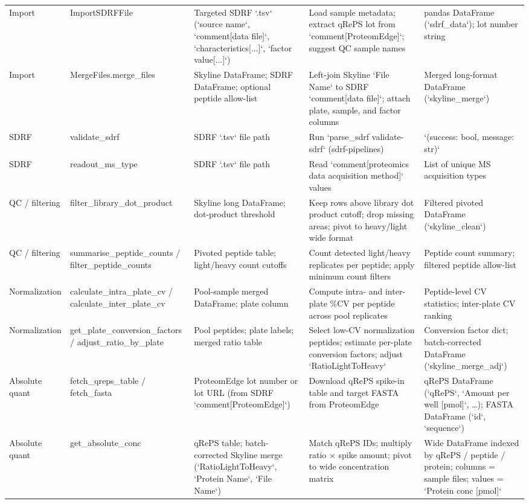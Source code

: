 \begin{table}
\begin{tabular}{llp{3.5cm}p{4.5cm}p{3.5cm}}
Import & ImportSDRFFile & Targeted SDRF `.tsv` (`source name`, `comment[data file]`, `characteristics[...]`, `factor value[...]`) & Load sample metadata; extract qRePS lot from `comment[ProteomEdge]`; suggest QC sample names & pandas DataFrame (`sdrf\_data`); lot number string \\
Import & MergeFiles.merge\_files & Skyline DataFrame; SDRF DataFrame; optional peptide allow-list & Left-join Skyline `File Name` to SDRF `comment[data file]`; attach plate, sample, and factor columns & Merged long-format DataFrame (`skyline\_merge`) \\
SDRF & validate\_sdrf & SDRF `.tsv` file path & Run `parse\_sdrf validate-sdrf` (sdrf-pipelines) & `(success: bool, message: str)` \\
SDRF & readout\_ms\_type & SDRF `.tsv` file path & Read `comment[proteomics data acquisition method]` values & List of unique MS acquisition types \\
QC / filtering & filter\_library\_dot\_product & Skyline long DataFrame; dot-product threshold & Keep rows above library dot product cutoff; drop missing areas; pivot to heavy/light wide format & Filtered pivoted DataFrame (`skyline\_clean`) \\
QC / filtering & summarise\_peptide\_counts / filter\_peptide\_counts & Pivoted peptide table; light/heavy count cutoffs & Count detected light/heavy replicates per peptide; apply minimum count filters & Peptide count summary; filtered peptide allow-list \\
Normalization & calculate\_intra\_plate\_cv / calculate\_inter\_plate\_cv & Pool-sample merged DataFrame; plate column & Compute intra- and inter-plate \%CV per peptide across pool replicates & Peptide-level CV statistics; inter-plate CV ranking \\
Normalization & get\_plate\_conversion\_factors / adjust\_ratio\_by\_plate & Pool peptides; plate labels; merged ratio table & Select low-CV normalization peptides; estimate per-plate conversion factors; adjust `RatioLightToHeavy` & Conversion factor dict; batch-corrected DataFrame (`skyline\_merge\_adj`) \\
Absolute quant & fetch\_qreps\_table / fetch\_fasta & ProteomEdge lot number or lot URL (from SDRF `comment[ProteomEdge]`) & Download qRePS spike-in table and target FASTA from ProteomEdge & qRePS DataFrame (`qRePS`, `Amount per well [pmol]`, …); FASTA DataFrame (`id`, `sequence`) \\
Absolute quant & get\_absolute\_conc & qRePS table; batch-corrected Skyline merge (`RatioLightToHeavy`, `Protein Name`, `File Name`) & Match qRePS IDs; multiply ratio × spike amount; pivot to wide concentration matrix & Wide DataFrame indexed by qRePS / peptide / protein; columns = sample files; values = `Protein conc [pmol]` \\

\end{tabular}
\end{table}
